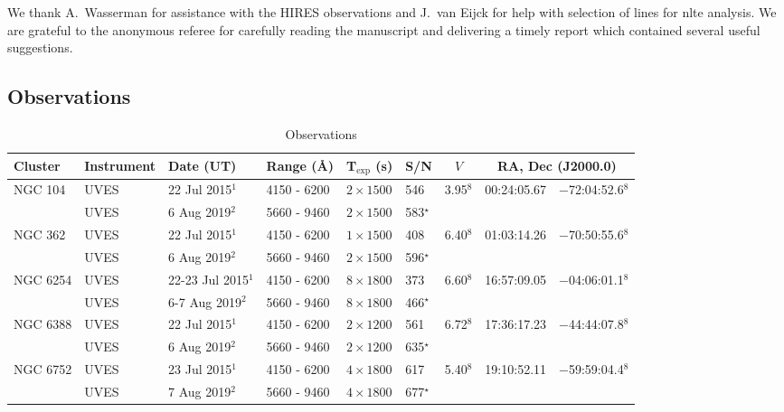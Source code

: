 \documentclass{aa}
\begin{document}
\begin{acknowledgements}
We thank A.\ Wasserman for assistance with the HIRES observations and J.\ van Eijck for help with selection of lines for \ac{nlte} analysis.  We are grateful to the anonymous referee for carefully reading the manuscript and delivering a timely report which contained several useful suggestions.
\end{acknowledgements}




\onecolumn

\begin{appendix}

\section{Observations}

\begin{table*}[h!]
\caption{Observations}
\label{tab:obs}
\centering
{\small
\begin{tabular}{llllllccc}
\hline\hline
Cluster & Instrument & Date (UT) &  Range (\AA ) & T$_\mathrm{exp}$ (s) & S/N  & $V$ & \multicolumn{2}{c}{RA, Dec (J2000.0)} \\ 
\hline
NGC 104 & UVES & 22 Jul 2015$^{1}$ & 4150 - 6200 & $2\times1500$ & 546  & 3.95$^8$ & 00:24:05.67 & $-$72:04:52.6$^8$ \\ 
  & UVES & 6 Aug 2019$^{2}$ & 5660 - 9460 & $2\times1500$ & 583$^\star$    \\
NGC 362 & UVES & 22 Jul 2015$^{1}$ & 4150 - 6200 & $1\times1500$ & 408 &  6.40$^8$ & 01:03:14.26 & $-$70:50:55.6$^8$ \\
  & UVES & 6 Aug 2019$^{2}$ & 5660 - 9460 & $2\times1500$ & 596$^\star$  \\ 
NGC 6254 & UVES & 22-23 Jul 2015$^{1}$ & 4150 - 6200 & $8\times1800$ & 373  & 6.60$^8$ & 16:57:09.05 & $-$04:06:01.1$^8$ \\
  & UVES & 6-7 Aug 2019$^{2}$ & 5660 - 9460 & $8\times1800$ & 466$^\star$  \\
NGC 6388 & UVES & 22 Jul 2015$^{1}$  & 4150 - 6200 & $2\times1200$ & 561  & 6.72$^8$ & 17:36:17.23 & $-$44:44:07.8$^8$ \\
  & UVES & 6 Aug 2019$^{2}$ & 5660 - 9460 & $2\times1200$ & 635$^\star$  \\
NGC 6752 & UVES & 23 Jul 2015$^{1}$  & 4150 - 6200 & $4\times1800$ & 617  & 5.40$^8$ & 19:10:52.11 & $-$59:59:04.4$^8$ \\
  & UVES & 7 Aug 2019$^{2}$ & 5660 - 9460 & $4\times1800$ & 677$^\star$  \\

\end{tabular}}
\end{table*}
\end{appendix}
\end{document}
